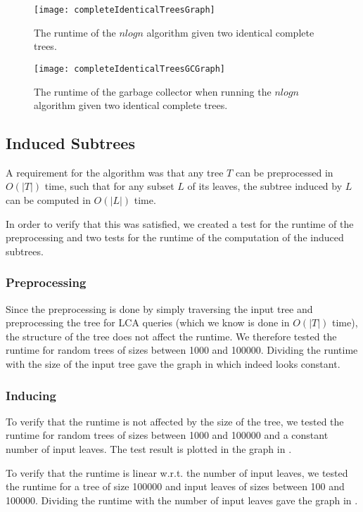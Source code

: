 \begin{figure}
	\texttt{[image: completeIdenticalTreesGraph]}
	\caption{The runtime of the $nlogn$ algorithm given two identical complete trees.}
	\label{completeIdenticalTreesGraph}
\end{figure}

\begin{figure}
	\texttt{[image: completeIdenticalTreesGCGraph]}
	\caption{The runtime of the garbage collector when running the $nlogn$ algorithm given two identical complete trees.}
	\label{completeIdenticalTreesGCGraph}
\end{figure}


\subsection{Induced Subtrees}
A requirement for the algorithm was that any tree $T$ can be preprocessed in $O(|T|)$ time, such that for any subset $L$ of its leaves, the subtree induced by $L$ can be computed in $O(|L|)$ time.

In order to verify that this was satisfied, we created a test for the runtime of the preprocessing and two tests for the runtime of the computation of the induced subtrees.

\subsubsection{Preprocessing}
Since the preprocessing is done by simply traversing the input tree and preprocessing the tree for LCA queries (which we know is done in $O(|T|)$ time), the structure of the tree does not affect the runtime. We therefore tested the runtime for random trees of sizes between 1000 and 100000. Dividing the runtime with the size of the input tree gave the graph in  which indeed looks constant.

\subsubsection{Inducing}
To verify that the runtime is not affected by the size of the tree, we tested the runtime for random trees of sizes between 1000 and 100000 and a constant number of input leaves. The test result is plotted in the graph in .

To verify that the runtime is linear w.r.t. the number of input leaves, we tested the runtime for a tree of size 100000 and input leaves of sizes between 100 and 100000. Dividing the runtime with the number of input leaves gave the graph in .




